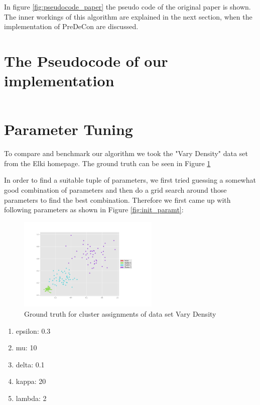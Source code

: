 \documentclass[a4paper]{article}
\begin{document}
In figure \ref{fig:pseudocode_paper} the pseudo code of the original paper is shown. The inner workings of this algorithm are explained in the next section, when the implementation of PreDeCon are discussed.

\section{The Pseudocode of our implementation}
\inputminted{python}{pseudo_code.py}

\section{Parameter Tuning}
To compare and benchmark our algorithm we took the "Vary Density" data set from the Elki homepage. The ground truth can be seen in Figure \ref{fig:ground_truth}

In order to find a suitable tuple of parameters, we first tried guessing a somewhat good combination of parameters and then do a grid search around those parameters to find the best combination. Therefore we first came up with following parameters as shown in Figure \ref{fig:init_paramt}:

\begin{figure}[ht]
	\centering
	\includegraphics[width=0.6\textwidth]{ground_truth.png}
	\caption{ Ground truth for cluster assignments of data set Vary Density}
    \label{fig:ground_truth}
\end{figure}

\begin{enumerate}
\item epsilon: 0.3
\item mu: 10
\item delta: 0.1
\item kappa: 20
\item lambda: 2
\end{enumerate}
\end{document}
